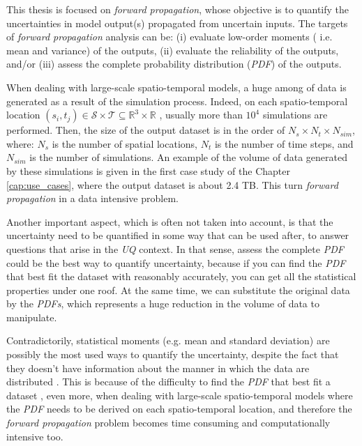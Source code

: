 This thesis is focused on  \textit{forward propagation}, whose objective is to quantify the uncertainties in model output(s) propagated from uncertain inputs. The targets of \textit{forward propagation} analysis can be: (i) evaluate low-order moments ( i.e. mean and variance) of the outputs, (ii) evaluate the reliability of the outputs, and/or (iii) assess the complete probability distribution (\textit{PDF}) of the outputs.

When dealing with large-scale spatio-temporal models, a huge among of data is generated as a result of the simulation process. Indeed, on each spatio-temporal location $(s_{i},t_{j}) \in \mathcal{S} \times \mathcal{T}\subseteq\mathbb{R}^{3}\times\mathbb{R}$ , usually more than $10^4$ simulations are performed. Then, the size of the output dataset is in the order of $N_{s}\times N_{t}\times N_{sim}$, where: $N_{s}$ is the number of spatial locations, $N_{t}$ is the number of time steps, and $N_{sim}$ is the number of simulations.  An example of the volume of data generated by these simulations is given in the first case study of the Chapter \ref{cap:use_cases}, where the output dataset is about 2.4 TB. This turn \textit{forward propagation} in a data intensive problem.

Another important aspect, which is often not taken into account, is that the uncertainty need to be quantified in some way that can be used after, to answer questions that arise in the \textit{UQ} context. In that sense, assess the complete \textit {PDF} could be the best way to quantify uncertainty, because if you can find the \textit {PDF} that best fit the dataset with reasonably accurately, you can get all the statistical properties under one roof. At the same time, we can substitute the original data by the \textit {PDFs}, which represents a huge reduction in the volume of data to manipulate.

Contradictorily, statistical moments (e.g. mean and standard deviation) are possibly the most used ways to quantify the uncertainty, despite the fact that they doesn't have information about the manner in which the data are distributed \cite{Lampasi2006}. This is because of the difficulty to find the \textit{PDF} that best fit a dataset \cite{Karian2011},  even more, when dealing with large-scale spatio-temporal models where the \textit{PDF} needs to be derived on each spatio-temporal location, and therefore the  \textit{forward propagation} problem becomes time consuming and computationally intensive too.

